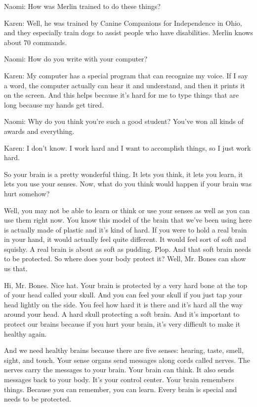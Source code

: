 Naomi: How was Merlin trained to do these things?

Karen: Well, he was trained by Canine Companions for Independence in Ohio, and they especially train dogs to assist people who have disabilities. Merlin knows about 70 commands.

Naomi: How do you write with your computer?

Karen: My computer has a special program that can recognize my voice. If I say a word, the computer actually can hear it and understand, and then it prints it on the screen. And this helps because it's hard for me to type things that are long because my hands get tired.

Naomi: Why do you think you're such a good student? You've won all kinds of awards and everything.

Karen: I don't know. I work hard and I want to accomplish things, so I just work hard.

So your brain is a pretty wonderful thing. It lets you think, it lets you learn, it lets you use your senses. Now, what do you think would happen if your brain was hurt somehow?

Well, you may not be able to learn or think or use your senses as well as you can use them right now. You know this model of the brain that we've been using here is actually made of plastic and it's kind of hard. If you were to hold a real brain in your hand, it would actually feel quite different. It would feel sort of soft and squishy. A real brain is about as soft as pudding. Plop. And that soft brain needs to be protected. So where does your body protect it? Well, Mr. Bones can show us that.

Hi, Mr. Bones. Nice hat. Your brain is protected by a very hard bone at the top of your head called your skull. And you can feel your skull if you just tap your head lightly on the side. You feel how hard it is there and it's hard all the way around your head. A hard skull protecting a soft brain. And it's important to protect our brains because if you hurt your brain, it's very difficult to make it healthy again.

And we need healthy brains because there are five senses: hearing, taste, smell, sight, and touch. Your sense organs send messages along cords called nerves. The nerves carry the messages to your brain. Your brain can think. It also sends messages back to your body. It's your control center. Your brain remembers things. Because you can remember, you can learn. Every brain is special and needs to be protected.

